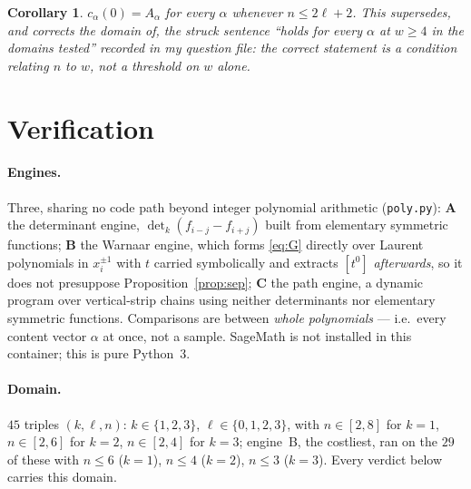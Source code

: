\documentclass[11pt]{article}
\theoremstyle{plain}
\newtheorem{corollary}[theorem]{Corollary}
\theoremstyle{definition}
\begin{document}
\begin{corollary}
$c_\alpha(0)=A_\alpha$ for every $\alpha$ whenever $n\le 2\ell+2$.  This supersedes, and
corrects the domain of, the struck sentence ``holds for every $\alpha$ at $w\ge4$ in the
domains tested'' recorded in my question file: the correct statement is a condition
relating $n$ to $w$, not a threshold on $w$ alone.
\end{corollary}

\section{Verification}\label{sec:verif}

\paragraph{Engines.}  Three, sharing no code path beyond integer polynomial arithmetic
(\texttt{poly.py}):
\textbf{A} the determinant engine, $\det_k(f_{i-j}-f_{i+j})$ built from elementary
symmetric functions;
\textbf{B} the Warnaar engine, which forms \eqref{eq:G} directly over Laurent polynomials
in $x_i^{\pm1}$ with $t$ carried symbolically and extracts $[t^0]$ \emph{afterwards}, so it
does not presuppose Proposition~\ref{prop:sep};
\textbf{C} the path engine, a dynamic program over vertical-strip chains using neither
determinants nor elementary symmetric functions.
Comparisons are between \emph{whole polynomials} --- i.e.\ every content vector $\alpha$ at
once, not a sample.
SageMath is not installed in this container; this is pure Python~3.

\paragraph{Domain.}  $45$ triples $(k,\ell,n)$:
$k\in\{1,2,3\}$, $\ell\in\{0,1,2,3\}$, with $n\in[2,8]$ for $k=1$, $n\in[2,6]$ for $k=2$,
$n\in[2,4]$ for $k=3$; engine~B, the costliest, ran on the $29$ of these with
$n\le6$ ($k=1$), $n\le4$ ($k=2$), $n\le3$ ($k=3$).  Every verdict below carries this
domain.
\end{document}
